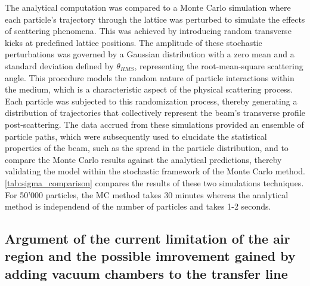 \documentclass[a4paper,
               biblatex,     %
               ]{jacow}
\begin{document}
The analytical computation was compared to a Monte Carlo simulation where each particle's trajectory through the lattice was perturbed to simulate the effects of scattering phenomena. This was achieved by introducing random transverse kicks at predefined lattice positions. The amplitude of these stochastic perturbations was governed by a Gaussian distribution with a zero mean and a standard deviation defined by $\theta_{RMS}$, representing the root-mean-square scattering angle. This procedure models the random nature of particle interactions within the medium, which is a characteristic aspect of the physical scattering process. Each particle was subjected to this randomization process, thereby generating a distribution of trajectories that collectively represent the beam's transverse profile post-scattering. The data accrued from these simulations provided an ensemble of particle paths, which were subsequently used to elucidate the statistical properties of the beam, such as the spread in the particle distribution, and to compare the Monte Carlo results against the analytical predictions, thereby validating the model within the stochastic framework of the Monte Carlo method. \ref{tab:sigma_comparison} compares the results of these two simulations techniques. For 50'000 particles, the MC method takes 30 minutes whereas the analytical method is independend of the number of particles and takes 1-2 seconds.

\begin{table}[ht]
\centering
{}
\caption{Sigma values for analytical and Monte Carlo methods in non-scattered and scattered particle distributions.}
\label{tab:sigma_comparison}
\end{table}


\subsection{Argument of the current limitation of the air region and the possible imrovement gained by adding vacuum chambers to the transfer line}
\end{document}
